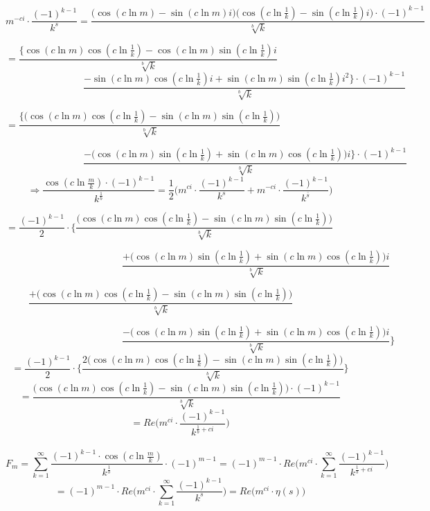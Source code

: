 \documentclass{amsart}
\begin{document}
	\[\]
	\[ m^{-ci} {\cdot} \frac{(-1)^{k-1}}{k^s} = \frac{\Big( \cos(c \ln m) {-} \sin(c \ln m) i \Big) \Big(\cos(c \ln \frac{1}{k}) {-} \sin(c \ln \frac{1}{k})i \Big) {\cdot} (-1)^{k-1} }{\sqrt[b]{k}} \]
	
	\[  = \frac{ \Big\{ \cos(c \ln m)\cos(c \ln \frac{1}{k}) {-} \cos(c \ln m)\sin(c \ln \frac{1}{k})i }{\sqrt[b]{k}} \qquad\qquad\qquad\qquad\qquad\qquad\qquad  \]
	\[ \qquad\qquad\qquad\qquad \frac{ {-} \sin(c \ln m)\cos(c \ln \frac{1}{k})i {+} \sin(c \ln m)\sin(c \ln \frac{1}{k})i^2 \Big\} {\cdot} (-1)^{k-1} }{\sqrt[b]{k}}   \]
	
	
	\[ = \frac{ \Big\{ \Big( \cos(c \ln m)\cos(c \ln \frac{1}{k}) - \sin(c \ln m)\sin(c \ln \frac{1}{k}) \Big)  }{\sqrt[b]{k}} \qquad\qquad\qquad\qquad\qquad\qquad\qquad  \]
	
	\[ \qquad\qquad\qquad\qquad \frac{ {-}\Big( \cos(c \ln m)\sin(c \ln \frac{1}{k}) {+} \sin(c \ln m)\cos(c \ln \frac{1}{k}) \Big)i \Big\} {\cdot} (-1)^{k-1} }{\sqrt[b]{k}}   \]
	\[\]
	\[ \Rightarrow \frac{\cos(c \ln \frac{m}{k}) \cdot (-1)^{k-1}}{k^{\frac{1}{b}}} = \frac{1}{2} \Big( m^{ci} {\cdot} \frac{(-1)^{k-1}}{k^{s}} + m^{-ci} {\cdot} \frac{(-1)^{k-1}}{k^{\bar{s}}}   \Big) \]
	
	\[ = \frac{(-1)^{k-1}}{2} {\cdot} \Biggl\{ \frac{ \Big( \cos(c \ln m)\cos(c \ln \frac{1}{k}) - \sin(c \ln m)\sin(c \ln \frac{1}{k}) \Big) }{\sqrt[b]{k}} \qquad\qquad\qquad\qquad\qquad \]
	
	\[ \qquad\qquad\qquad\qquad\qquad\qquad \frac{ {+} \Big( \cos(c \ln m)\sin(c \ln \frac{1}{k}) {+} \sin(c \ln m)\cos(c \ln \frac{1}{k}) \Big)i  }{\sqrt[b]{k}}   \]
	
	\[ \frac{ {+} \Big( \cos(c \ln m)\cos(c \ln \frac{1}{k}) - \sin(c \ln m)\sin(c \ln \frac{1}{k}) \Big)  }{\sqrt[b]{k}}  \qquad\qquad \]
	
	\[ \qquad\qquad\qquad\qquad\qquad\qquad \frac{ {-}\Big( \cos(c \ln m)\sin(c \ln \frac{1}{k}) {+} \sin(c \ln m)\cos(c \ln \frac{1}{k}) \Big)i }{\sqrt[b]{k}} \Biggr\}  \]
	\[\]
	\[ = \frac{(-1)^{k-1}}{2} {\cdot} \Bigg\{ \frac{ 2 \Big( \cos(c \ln m)\cos(c \ln \frac{1}{k}) - \sin(c \ln m)\sin(c \ln \frac{1}{k}) \Big) }{\sqrt[b]{k}} \Biggr\}  \]
	\[\]
	\[ = \frac{ \Big( \cos(c \ln m)\cos(c \ln \frac{1}{k}) - \sin(c \ln m)\sin(c \ln \frac{1}{k}) \Big) {\cdot} (-1)^{k-1} }{\sqrt[b]{k}}      \]
	\[\]
	\[ = Re \Big( m^{ci} \cdot \frac{(-1)^{k-1}}{k^{\frac{1}{b}+ci}} \Big) \]
	\\
	\[ F_m = \sum\limits_{k=1}^{\infty} \frac{(-1)^{k-1} {\cdot} \cos(c \ln \frac{m}{k})}{k^{\frac{1}{b}}} {\cdot} (-1)^{m-1} = (-1)^{m-1} {\cdot} Re \Big( m^{ci} {\cdot} \sum\limits_{k=1}^{\infty}\frac{(-1)^{k-1}}{k^{\frac{1}{b}+ci}}   \Big) \]
	\[ = (-1)^{m-1} {\cdot} Re \Big( m^{ci} {\cdot} \sum\limits_{k=1}^{\infty}\frac{(-1)^{k-1}}{k^s}  \Big) = Re \Big( m^{ci} {\cdot} \eta(s)  \Big)  \]
	
\end{document}
